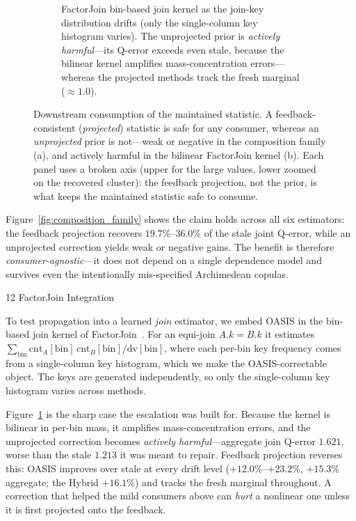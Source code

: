 \documentclass[preprint,12pt]{elsarticle}
\makeatletter
\renewcommand\subsubsection{\@startsection{subsubsection}{3}{\z@}%
           {12\p@ \@plus 6\p@ \@minus 3\p@}%
           {\p@}%
           {\normalfont\normalsize\bfseries}}
\makeatother
\begin{document}
\begin{figure}[t]
\begin{subfigure}{\linewidth}
    \caption{FactorJoin bin-based join kernel as the join-key distribution drifts (only the
    single-column key histogram varies). The unprojected prior is \emph{actively harmful}---its
    Q-error exceeds even stale, because the bilinear kernel amplifies mass-concentration
    errors---whereas the projected methods track the fresh marginal ($\approx 1.0$).}
    \label{fig:factorjoin}
  \end{subfigure}
  \caption{Downstream consumption of the maintained statistic. A feedback-consistent
  (\emph{projected}) statistic is safe for any consumer, whereas an \emph{unprojected} prior is
  not---weak or negative in the composition family (a), and actively harmful in the bilinear
  FactorJoin kernel (b). Each panel uses a broken axis (upper for the large values, lower
  zoomed on the recovered cluster): the feedback projection, not the prior, is what keeps the
  maintained statistic safe to consume.}
  \label{fig:downstream}
\end{figure}

Figure~\ref{fig:composition_family} shows the claim holds across all six estimators: the
feedback projection recovers $19.7\%$--$36.0\%$ of the stale joint Q-error, while an unprojected
correction yields weak or negative gains. The benefit is therefore \emph{consumer-agnostic}---it
does not depend on a single dependence model and survives even the intentionally mis-specified
Archimedean copulas.

\subsubsection{FactorJoin Integration}
\label{sec:factorjoin}

To test propagation into a learned \emph{join} estimator, we embed OASIS in the
bin-based join kernel of FactorJoin~\cite{wu2023factorjoin}. For an equi-join
$A.k=B.k$ it estimates
$\sum_{\text{bin}}\mathrm{cnt}_A[\text{bin}]\,\mathrm{cnt}_B[\text{bin}]/\mathrm{dv}[\text{bin}]$,
where each per-bin key frequency comes from a single-column key histogram, which we make
the OASIS-correctable object. The keys are generated independently, so only the
single-column key histogram varies across methods.


Figure~\ref{fig:factorjoin} is the sharp case the escalation was built for. Because the kernel
is bilinear in per-bin mass, it amplifies mass-concentration errors, and the unprojected
correction becomes \emph{actively harmful}---aggregate join Q-error $1.621$, worse than the
stale $1.213$ it was meant to repair. Feedback projection reverses this: OASIS improves over
stale at every drift level ($+12.0\%$--$+23.2\%$, $+15.3\%$ aggregate; the Hybrid $+16.1\%$) and
tracks the fresh marginal throughout. A correction that helped the mild consumers above can
\emph{hurt} a nonlinear one unless it is first projected onto the feedback.
\end{document}
